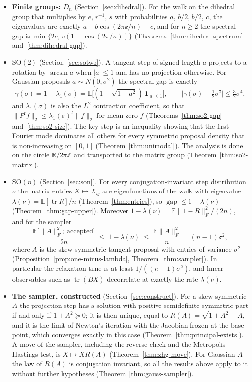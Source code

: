 \documentclass[11pt]{amsart}
\theoremstyle{definition}
\theoremstyle{remark}
\newcommand{\R}{\mathbb{R}}
\newcommand{\Z}{\mathbb{Z}}
\newcommand{\E}{\mathbb{E}}
\newcommand{\SO}{\mathrm{SO}}
\newcommand{\tr}{\operatorname{tr}}
\newcommand{\one}{\mathbf{1}}
\newcommand{\fro}[1]{\lVert #1\rVert_{F}}
\newcommand{\gap}{\operatorname{gap}}
\begin{document}
\begin{itemize}
\item \textbf{Finite groups: $D_n$} (Section~\ref{sec:dihedral}).  For the walk on the dihedral
group that multiplies by $e$, $r^{\pm1}$, $s$ with probabilities $a$, $b/2$, $b/2$, $c$, the
eigenvalues are exactly $a+b\cos(2\pi k/n)\pm c$, and for $n\ge2$ the spectral gap is
$\min\{2c,\ b(1-\cos(2\pi/n))\}$ (Theorems~\ref{thm:dihedral-spectrum}
and~\ref{thm:dihedral-gap}).

\item \textbf{$\SO(2)$} (Section~\ref{sec:sotwo}).  A tangent step of signed length $a$ projects
to a rotation by $\arcsin a$ when $|a|\le 1$ and has no projection otherwise.  For Gaussian
proposals $a\sim N(0,\sigma^2)$ the spectral gap is exactly
\[
  \gamma(\sigma)=1-\lambda_1(\sigma)=\E\bigl[(1-\sqrt{1-a^2})\,\one_{|a|\le1}\bigr],
  \qquad \bigl|\gamma(\sigma)-\tfrac12\sigma^2\bigr|\le\tfrac32\sigma^4,
\]
and $\lambda_1(\sigma)$ is also the $L^2$ contraction coefficient, so that
$\lVert P^tf\rVert_2\le\lambda_1(\sigma)^t\lVert f\rVert_2$ for mean-zero $f$
(Theorems~\ref{thm:so2-gap} and~\ref{thm:so2-size}).  The key step is an inequality showing
that the first Fourier mode dominates all others for every symmetric proposal density that is
non-increasing on $[0,1]$ (Theorem~\ref{thm:unimodal}).  The analysis is done on the circle
$\R/2\pi\Z$ and transported to the matrix group (Theorem~\ref{thm:so2-matrix}).

\item \textbf{$\SO(n)$} (Section~\ref{sec:son}).  For every conjugation-invariant step
distribution $\nu$ the matrix entries $X\mapsto X_{ij}$ are eigenfunctions of the walk with
eigenvalue $\lambda(\nu)=\E[\tr R]/n$ (Theorem~\ref{thm:entries}), so
$\gap\le 1-\lambda(\nu)$ (Theorem~\ref{thm:gap-upper}).  Moreover
$1-\lambda(\nu)=\E\fro{1-R}^2/(2n)$, and for the sampler
\[
  \frac{\E\bigl[\fro{A}^2;\ \text{accepted}\bigr]}{2n}\;\le\;1-\lambda(\nu)\;\le\;\frac{\E\fro{A}^2}{n}=(n-1)\sigma^2,
\]
where $A$ is the skew-symmetric tangent proposal with entries of variance $\sigma^2$
(Proposition~\ref{prop:one-minus-lambda}, Theorem~\ref{thm:sampler}).  In particular the
relaxation time is at least $1/((n-1)\sigma^2)$, and linear observables such as $\tr(BX)$
decorrelate at exactly the rate $\lambda(\nu)$.

\item \textbf{The sampler, constructed} (Section~\ref{sec:construct}).  For a skew-symmetric
$A$ the projection step has a solution with positive semidefinite symmetric part if and only
if $1+A^2\succeq0$; it is then unique, equal to $R(A)=\sqrt{1+A^2}+A$, and it is the limit of
Newton's iteration with the Jacobian frozen at the base point, which converges exactly in this
case (Theorem~\ref{thm:principal-exists}).  A move of the sampler, including the reverse check
and the Metropolis--Hastings test, is $X\mapsto XR(A)$ (Theorem~\ref{thm:zhg-move}).  For
Gaussian $A$ the law of $R(A)$ is conjugation invariant, so all the results above apply to it
without further hypotheses (Theorem~\ref{thm:gauss-sampler}).


\end{itemize}
\end{document}
